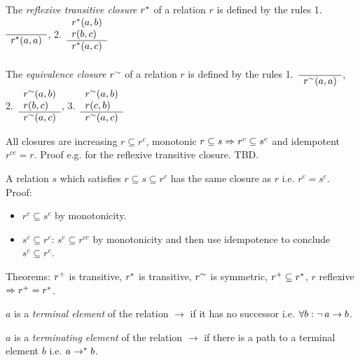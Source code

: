 \documentclass{article}
\begin{document}
\begin{definition} The \emph{reflexive transitive closure} $r^*$ of a relation $r$ is
  defined by the rules
1.~$\begin{array}{l}  \\ \hline r^*(a,a)\end{array}$,
2.~$\begin{array}{l} r^*(a,b) \\ r(b,c) \\ \hline r^*(a,c)\end{array}$
\end{definition}

\begin{definition} The \emph{equivalence closure} $r^\sim$ of a relation $r$ is
  defined by the rules
  1.~$\begin{array}{l}  \\ \hline r^\sim(a,a)\end{array}$,
  2.~$\begin{array}{l} r^\sim(a,b)
    \\ r(b,c) \\ \hline r^\sim(a,c)\end{array}$,
  3.~$\begin{array}{l} r^\sim(a,b) \\ r(c,b) \\ \hline r^\sim(a,c)\end{array}$
\end{definition}

\begin{theorem}
  All closures are increasing $r \subseteq r^c$, monotonic
  $r \subseteq s \Rightarrow r^c \subseteq s^c$ and idempotent $r^{cc} = r$. Proof
  e.g. for the reflexive transitive closure. TBD.
\end{theorem}

\begin{theorem}
A relation $s$ which satisfies $r \subseteq s \subseteq r^c$ has the same closure
as $r$ i.e. $r^c = s^c$. Proof:
  \begin{itemize}
  \item $r^c \subseteq s^c$ by monotonicity.
  \item $s^c \subseteq r^c$: $s^c \subseteq r^{cc}$ by
    monotonicity and then use idempotence to conclude $s^c \subseteq r^c$.
  \end{itemize}
\end{theorem}



Theorems: $r^+$ is transitive, $r^*$ is transitive, $r^\sim$ is
symmetric, $r^+\subseteq r^*$, $r$ reflexive $\Rightarrow r^+ =
r^*$.


\begin{definition}
  $a$ is a \emph{terminal element} of the relation $\to$ if it has no
  successor i.e. $\forall b: \neg\, a \to b$.
\end{definition}

\begin{definition}
  $a$ is a \emph{terminating element} of the relation $\to$ if there is a path
  to a terminal element $b$ i.e. $a \to^* b$.
\end{definition}
\end{document}
